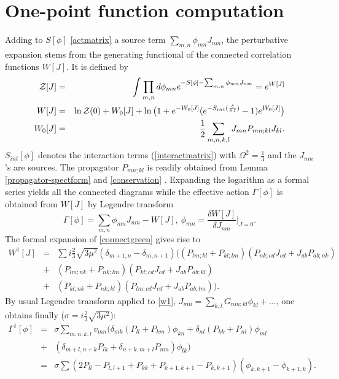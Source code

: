 \documentclass[a4paper,11pt,twoside]{article}
\numberwithin{equation}{section}
\newcommand{\eqn}[1]{(\ref{#1})}
\theoremstyle{nonumberplain}
\newcounter{and}
\begin{document}
\section{One-point function computation}\label{onepoint-comput}
Adding to $S[\phi]$ \eqref{actmatrix} a source term $\sum_{m,n}\phi_{mn}J_{nm}$, the perturbative expansion stems from the generating functional of the connected correlation functions $W[J]$. It is defined by 
\begin{eqnarray}
{\cal{Z}}[J]&=&\int\prod_{m,n}d\phi_{mn}e^{-S[\phi]-\sum_{m,n}\phi_{mn}J_{nm}}=e^{W[J]}\label{generating-Z}\\
W[J]&=&\ln{\cal{Z}}(0)+W_0[J]+\ln\big(1+e^{-W_0[J]} ( e^{ -S_{int}(\frac{\delta}{\delta J})}   -1)e^{W_0[J]} \big)\label{connectgreen}\\
W_0[J]&=&\frac{1}{2}\sum_{m,n,k,l}J_{mn}P_{mn;kl}J_{kl}\label{connectfree}.
\end{eqnarray}
$S_{int}[\phi]$ denotes the interaction terms \eqn{interactmatrix} with $\Omega^2=\frac{1}{3}$ and the $J_{nm}$'s are sources. The propagator  $P_{mn;kl}$ is readily obtained from Lemma \ref{propagator-spectform} and \eqref{conservation} . Expanding the logarithm as a formal series yields all the connected diagrams while the effective action $\Gamma[\phi]$ is  obtained from $W[J]$ by Legendre transform
\begin{equation}
\Gamma[\phi]=\sum_{m,n}\phi_{mn}J_{nm}-W[J],\ \phi_{mn}=\frac{\delta W[J]}{\delta J_{nm}}\vert_{J=0}\label{effectiveaction}.
\end{equation}
The formal expansion of \eqref{connectgreen} gives rise to
\begin{eqnarray}
W^{1}[J]&=& \sum i\frac{2}{3}{\sqrt{3\mu^2}}(\delta_{m+1,n}-\delta_{m,n+1})\big((P_{lm;kl}+P_{kl;lm})(P_{nk;cd}J_{cd}+J_{ab}P_{ab;nk})\nonumber\\
&+&(P_{lm;nk}+P_{nk;lm})(P_{kl;cd}J_{cd}+J_{ab}P_{ab;kl})\nonumber\\
&+&(P_{kl;nk}+P_{nk;kl})(P_{lm;cd}J_{cd}+J_{ab}P_{ab;lm}) \big).\label{w1}
\end{eqnarray}
By usual Legendre transform applied to \eqref{w1}, $J_{mn}=\sum_{k,l}G_{nm;kl}\phi_{kl}+...$, one obtains finally ($\sigma=i\frac{2}{3}{\sqrt{3\mu^2}}$):
\begin{eqnarray}
\Gamma^1[\phi]&=&\sigma\sum_{m,n,k,l} v_{mn}\big(\delta_{mk}(P_{ll}+P_{km})\phi_{kn} +\delta_{nl}(P_{kk}+P_{nl})\phi_{ml}\nonumber\\
&+&(\delta_{m+l,n+k}P_{lk}+\delta_{n+k,m+l}P_{nm})\phi_{lk} \big)\nonumber\\
&=&\sigma\sum(2P_{ll}-P_{l,l+1}+P_{kk}+P_{k+1,k+1}-P_{k,k+1})(\phi_{k,k+1}-\phi_{k+1,k})\label{cgamma1}.
\end{eqnarray}
\end{document}
